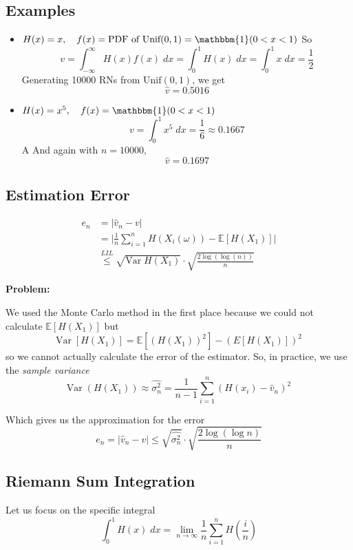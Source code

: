 \documentclass[12pt]{article}
\renewcommand{\hat}[1]{\widehat{#1}}
\newcommand{\E}{\mathbb{E}}
\newcommand{\ind}{\mathbbm{1}}
\newcommand{\Var}{\text{Var}\;}
\begin{document}
\subsection*{Examples}
\begin{itemize}
    \item $H(x) = x, \quad f(x) = \text{PDF of Unif}(0, 1) = \ind(0 < x < 1)$
    So 
    \[v = \int_{-\infty}^{\infty} H(x) f(x)\; dx = \int_0^1 H(x)\; dx = \int_0^1 x\; dx = \frac{1}{2}\]
    Generating 10000 RNs from $\text{Unif}(0, 1)$, we get 
    \[\hat v = 0.5016\]

    \item $H(x) = x^5, \quad f(x) = \ind(0 < x < 1)$
    \[v = \int_0^1 x^5 \; dx = \frac{1}{6} \approx 0.1667\]A
    And again with $n = 10000$,
    \[\hat v = 0.1697\]
\end{itemize}

\subsection*{Estimation Error}
\begin{align*}
    e_n &= \big\vert \hat v_n - v\big\vert\\
    &= \bigg\vert \frac{1}{n}\sum_{i=1}^n H(X_i(\omega)) - \E[H(X_1)] \bigg\vert\\
    &\overset{LIL}{\leq} \sqrt{\Var H(X_1)} \cdot \sqrt{\frac{2\log(\log(n))}{n}}
\end{align*}

\vspace*{0.25in}

\textbf{Problem:} 

We used the Monte Carlo method in the first place because we could not calculate $\E[H(X_1)]$ but
\[\Var[H(X_1)] = \E[(H(X_1))^2] - (E[H(X_1)])^2\]
so we cannot actually calculate the error of the estimator. So, in practice, we use the \emph{sample variance}
\[\Var(H(X_1)) \approx \widehat{\sigma_n^2} = \frac{1}{n - 1} \sum_{i=1}^n\left(H(x_i) - \hat v_n\right)^2\]

Which gives us the approximation for the error
\[e_n = \big\vert \hat v_n - v \big\vert \leq \sqrt{\widehat{\sigma_n^2}} \cdot \sqrt{\frac{2\log(\log n)}{n}}\]

\subsection*{Riemann Sum Integration}
Let us focus on the specific integral
\[\int_0^1 H(x)\; dx = \lim_{n\to\infty} \frac{1}{n}\sum_{i=1}^n H(\frac{i}{n})\]
\end{document}
